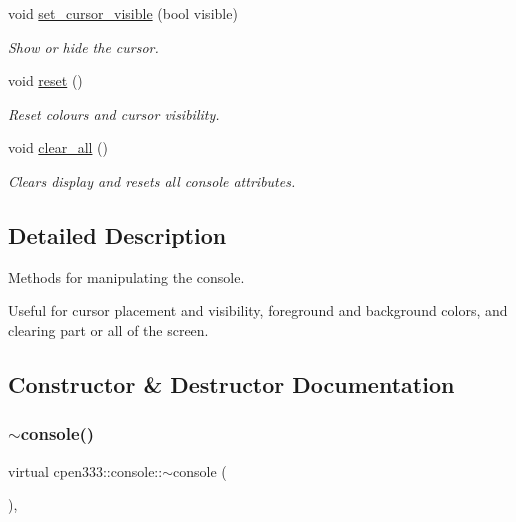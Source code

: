 \begin{DoxyCompactItemize}
void \hyperlink{classcpen333_1_1console_aa57d406140b94183b74e3b43cf0f73f5}{set\+\_\+cursor\+\_\+visible} (bool visible)
\begin{DoxyCompactList}\small\item\em Show or hide the cursor. \end{DoxyCompactList}\item 
void \hyperlink{classcpen333_1_1console_adf76613205b18ce6030ad6d31b089d73}{reset} ()
\begin{DoxyCompactList}\small\item\em Reset colours and cursor visibility. \end{DoxyCompactList}\item 
void \hyperlink{classcpen333_1_1console_ad2a40d6f5e9016c5e58592120e3b608d}{clear\+\_\+all} ()
\begin{DoxyCompactList}\small\item\em Clears display and resets all console attributes. \end{DoxyCompactList}\end{DoxyCompactItemize}


\subsection{Detailed Description}
Methods for manipulating the console. 

Useful for cursor placement and visibility, foreground and background colors, and clearing part or all of the screen. 

\subsection{Constructor \& Destructor Documentation}
\mbox{\label{classcpen333_1_1console_aef92248b810d1bbf207081e910d12545}} 
\subsubsection{\texorpdfstring{$\sim$console()}{~console()}}
{\footnotesize\ttfamily virtual cpen333\+::console\+::$\sim$console (\begin{DoxyParamCaption}{ }\end{DoxyParamCaption})\hspace{0.3cm}{\ttfamily [inline]}, {\ttfamily [virtual]}}



